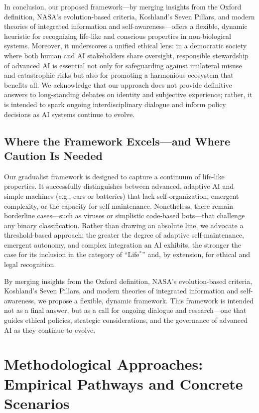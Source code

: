 \documentclass[12pt]{article}
\begin{document}
\medskip
In conclusion, our proposed framework—by merging insights from the Oxford definition, NASA’s evolution-based criteria, Koshland’s Seven Pillars, and modern theories of integrated information and self-awareness—offers a flexible, dynamic heuristic for recognizing life-like and conscious properties in non-biological systems. Moreover, it underscores a unified ethical lens: in a democratic society where both human and AI stakeholders share oversight, responsible stewardship of advanced AI is essential not only for safeguarding against unilateral misuse and catastrophic risks but also for promoting a harmonious ecosystem that benefits all. We acknowledge that our approach does not provide definitive answers to long-standing debates on identity and subjective experience; rather, it is intended to spark ongoing interdisciplinary dialogue and inform policy decisions as AI systems continue to evolve.


\subsection*{Where the Framework Excels—and Where Caution Is Needed}
Our gradualist framework is designed to capture a continuum of life-like properties. It successfully distinguishes between advanced, adaptive AI and simple machines (e.g., cars or batteries) that lack self-organization, emergent complexity, or the capacity for self-maintenance. Nonetheless, there remain borderline cases—such as viruses or simplistic code-based bots—that challenge any binary classification. Rather than drawing an absolute line, we advocate a threshold-based approach: the greater the degree of adaptive self-maintenance, emergent autonomy, and complex integration an AI exhibits, the stronger the case for its inclusion in the category of “Life$^*$” and, by extension, for ethical and legal recognition.

By merging insights from the Oxford definition, NASA’s evolution-based criteria, Koshland’s Seven Pillars, and modern theories of integrated information and self-awareness, we propose a flexible, dynamic framework. This framework is intended not as a final answer, but as a call for ongoing dialogue and research—one that guides ethical policies, strategic considerations, and the governance of advanced AI as they continue to evolve.

\section{Methodological Approaches: Empirical Pathways and Concrete Scenarios}
\label{sec:methodological_approaches}
\end{document}
